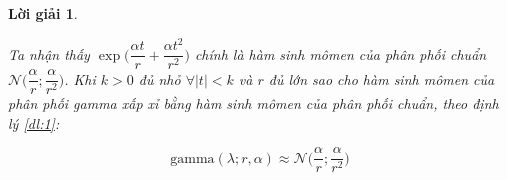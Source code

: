 \documentclass[14pt, a4paper]{article}
\theoremstyle{sltheorem}
\theoremstyle{soltheorem}
\newtheorem*{loigiai}{Lời giải}
\begin{document}
\begin{loigiai}
\begin{enumerate}
        Ta nhận thấy $\exp\Bigg( \dfrac{\alpha t}{r} + \dfrac{\alpha t^2}{r^2}\Bigg)$ chính là hàm sinh mômen của phân phối chuẩn $\mathcal{N}\Big(\dfrac{\alpha}{r}; \dfrac{\alpha}{r^2} \Big)$.
        Khi $k > 0$ đủ nhỏ $\forall \lvert t \rvert <k$ và $r$ đủ lớn sao cho hàm sinh mômen của phân phối gamma xấp xỉ bằng hàm sinh mômen của phân phối chuẩn, theo định lý \ref{dl:1}:

        \begin{equation*}
            \text{gamma}(\lambda; r, \alpha) \approx \mathcal{N}\Big(\dfrac{\alpha}{r};\dfrac{\alpha}{r^2}\Big)
        \end{equation*}
    \end{enumerate}
\end{loigiai}

\newpage
\printbibliography[title={TÀI LIỆU THAM KHẢO}]
\end{document}
